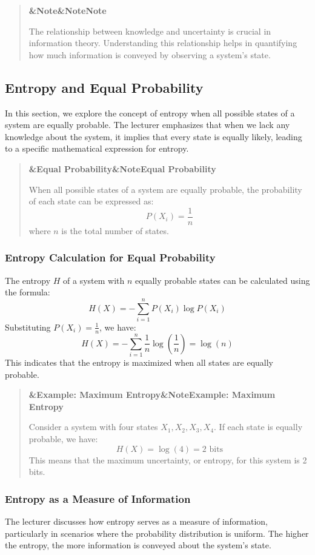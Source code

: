 \documentclass[a4paper]{article}
\newcommand{\boxheading}[1]{%
  \par\smallskip
  \noindent\textbf{\ifx&#1&Note\else#1\fi}\par
  \smallskip
}
\newenvironment{defbox}[1][]{%
  \begin{quote}\color{green!40!black}\boxheading{#1}\normalcolor
}{\end{quote}}
\newenvironment{exbox}[1][]{%
  \begin{quote}\color{brown!70!black}\boxheading{#1}\normalcolor
}{\end{quote}}
\newenvironment{rembox}[1][]{%
  \begin{quote}\color{black!70}\boxheading{#1}\normalcolor
}{\end{quote}}
\begin{document}
\begin{rembox}[Note]
The relationship between knowledge and uncertainty is crucial in information theory. Understanding this relationship helps in quantifying how much information is conveyed by observing a system's state.
\end{rembox}

\subsection{Entropy and Equal Probability}
In this section, we explore the concept of entropy when all possible states of a system are equally probable. The lecturer emphasizes that when we lack any knowledge about the system, it implies that every state is equally likely, leading to a specific mathematical expression for entropy.

\begin{defbox}[Equal Probability]
When all possible states of a system are equally probable, the probability of each state can be expressed as:
\[
P(X_i) = \frac{1}{n}
\]
where \( n \) is the total number of states.
\end{defbox}

\subsubsection{Entropy Calculation for Equal Probability}
The entropy \( H \) of a system with \( n \) equally probable states can be calculated using the formula:
\begin{equation}
H(X) = -\sum_{i=1}^{n} P(X_i) \log P(X_i)
\end{equation}
Substituting \( P(X_i) = \frac{1}{n} \), we have:
\begin{equation}
H(X) = -\sum_{i=1}^{n} \frac{1}{n} \log \left(\frac{1}{n}\right) = \log(n)
\end{equation}
This indicates that the entropy is maximized when all states are equally probable.

\begin{exbox}[Example: Maximum Entropy]
Consider a system with four states \( X_1, X_2, X_3, X_4 \). If each state is equally probable, we have:
\[
H(X) = \log(4) = 2 \text{ bits}
\]
This means that the maximum uncertainty, or entropy, for this system is 2 bits.
\end{exbox}

\subsubsection{Entropy as a Measure of Information}
The lecturer discusses how entropy serves as a measure of information, particularly in scenarios where the probability distribution is uniform. The higher the entropy, the more information is conveyed about the system's state.
\end{document}
